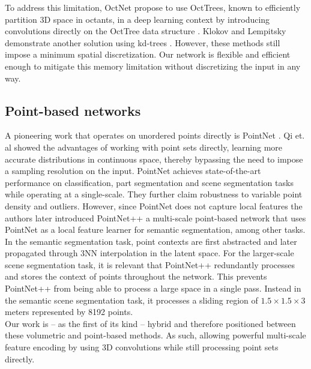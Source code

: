 \documentclass[runningheads]{llncs}
\begin{document}
To address this limitation, OctNet propose to use OctTrees, known to efficiently partition 3D space in octants, in a deep learning context by introducing convolutions directly on the OctTree data structure \cite{Riegler2017}. Klokov and Lempitsky demonstrate another solution using kd-trees \cite{Klokov2017}. However, these methods still impose a minimum spatial discretization. Our network is flexible and efficient enough to mitigate this memory limitation without discretizing the input in any way.

\subsection{Point-based networks}
\label{section:point-networks}

A pioneering work that operates on unordered points directly is PointNet \cite{Qi2017}. Qi et. al showed the advantages of working with point sets directly, learning more accurate distributions in continuous space, thereby bypassing the need to impose a sampling resolution on the input. PointNet achieves state-of-the-art performance on classification, part segmentation and scene segmentation tasks while operating at a single-scale. They further claim robustness to variable point density and outliers. However, since PointNet does not capture local features the authors later introduced PointNet++ \cite{Qi2017_2} 
a multi-scale point-based network that uses PointNet as a local feature learner for semantic segmentation, among other tasks. In the semantic segmentation task, point contexts are first abstracted and later propagated through 3NN interpolation in the latent space. For the larger-scale scene segmentation task, it is relevant that PointNet++ redundantly processes and stores the context of points throughout the network. This prevents PointNet++ from being able to process a large space in a single pass. Instead in the semantic scene segmentation task, it processes a sliding region of $1.5 \times 1.5 \times 3$ meters represented by 8192 points.\\ 

Our work is -- as the first of its kind -- hybrid and therefore positioned between these volumetric and point-based methods.
As such, allowing powerful multi-scale feature encoding by using 3D convolutions while still processing point sets directly.
\end{document}
